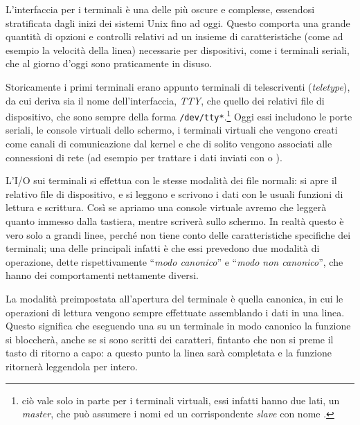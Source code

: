 L'interfaccia per i terminali è una delle più oscure e complesse, essendosi
stratificata dagli inizi dei sistemi Unix fino ad oggi. Questo comporta una
grande quantità di opzioni e controlli relativi ad un insieme di
caratteristiche (come ad esempio la velocità della linea) necessarie per
dispositivi, come i terminali seriali, che al giorno d'oggi sono praticamente
in disuso.

Storicamente i primi terminali erano appunto terminali di telescriventi
(\textit{teletype}), da cui deriva sia il nome dell'interfaccia, \textit{TTY},
che quello dei relativi file di dispositivo, che sono sempre della forma
\texttt{/dev/tty*}.\footnote{ciò vale solo in parte per i terminali virtuali,
  essi infatti hanno due lati, un \textit{master}, che può assumere i nomi
   ed un corrispondente \textit{slave} con nome
  .}  Oggi essi includono le porte seriali, le
console virtuali dello schermo, i terminali virtuali che vengono creati come
canali di comunicazione dal kernel e che di solito vengono associati alle
connessioni di rete (ad esempio per trattare i dati inviati con  o
).

L'I/O sui terminali si effettua con le stesse modalità dei file normali: si
apre il relativo file di dispositivo, e si leggono e scrivono i dati con le
usuali funzioni di lettura e scrittura. Così se apriamo una console virtuale
avremo che  leggerà quanto immesso dalla tastiera, mentre
 scriverà sullo schermo.  In realtà questo è vero solo a grandi
linee, perché non tiene conto delle caratteristiche specifiche dei terminali;
una delle principali infatti è che essi prevedono due modalità di operazione,
dette rispettivamente ``\textsl{modo canonico}'' e ``\textsl{modo non
  canonico}'', che hanno dei comportamenti nettamente
diversi. 


La modalità preimpostata all'apertura del terminale è quella canonica, in cui
le operazioni di lettura vengono sempre effettuate assemblando i dati in una
linea. Questo significa che eseguendo una  su un terminale in modo
canonico la funzione si bloccherà, anche se si sono scritti dei caratteri,
fintanto che non si preme il tasto di ritorno a capo: a questo punto la linea
sarà completata e la funzione ritornerà leggendola per intero.

